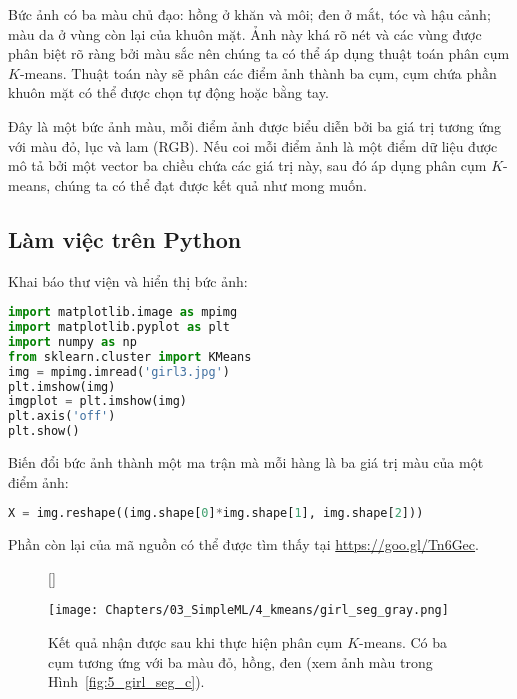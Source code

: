 

Bức ảnh có ba màu chủ đạo: hồng ở khăn và môi; đen ở mắt, tóc và hậu cảnh; màu
da ở vùng còn lại của khuôn mặt. Ảnh này khá rõ nét và các vùng được phân biệt
rõ ràng bởi màu sắc nên chúng ta có thể áp dụng thuật toán phân cụm $K$-means.
Thuật toán này sẽ phân các điểm ảnh thành ba cụm, cụm chứa phần khuôn mặt có thể được chọn tự động hoặc bằng tay. 

Đây là một bức ảnh màu, mỗi điểm ảnh được biểu diễn bởi ba giá trị tương ứng với
màu đỏ, lục và lam (RGB). Nếu coi mỗi điểm ảnh là một điểm dữ liệu được mô tả
bởi một vector ba chiều chứa các giá trị này, sau đó áp dụng phân cụm $K$-means,
chúng ta có thể đạt được kết quả như mong muốn.



\subsection{Làm việc trên Python}

{Khai báo thư viện và hiển thị bức ảnh:}

\begin{lstlisting}[language=Python]
import matplotlib.image as mpimg
import matplotlib.pyplot as plt
import numpy as np
from sklearn.cluster import KMeans
img = mpimg.imread('girl3.jpg')
plt.imshow(img)
imgplot = plt.imshow(img)
plt.axis('off')
plt.show()
\end{lstlisting}


{Biến đổi bức ảnh thành một ma trận mà mỗi hàng là ba giá trị màu của một điểm ảnh:}
\begin{lstlisting}[language=Python]
X = img.reshape((img.shape[0]*img.shape[1], img.shape[2]))
\end{lstlisting}

Phần còn lại của mã nguồn có thể được tìm thấy tại \url{https://goo.gl/Tn6Gec}.



\begin{figure}[t]
    [\FBwidth]
    {\caption{ 
    Kết quả nhận được sau khi thực hiện phân cụm $K$-means.
    Có ba cụm tương ứng với ba màu đỏ, hồng, đen (xem ảnh màu trong Hình~\ref{fig:5_girl_seg_c}). 
    }
    \label{fig:5_girl_seg}}
    { %
    \texttt{[image: Chapters/03\_SimpleML/4\_kmeans/girl\_seg\_gray.png]}
    }
\end{figure}

